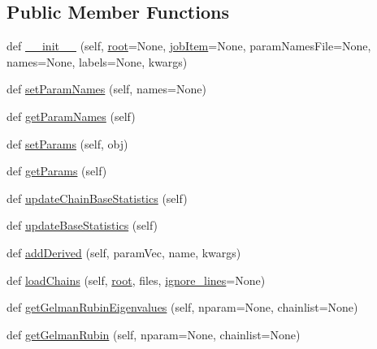 \subsection*{Public Member Functions}
\begin{DoxyCompactItemize}
\item 
def \mbox{\hyperlink{classgetdist_1_1chains_1_1Chains_af5c083e16efd5ecd1d6d41ecae4e6180}{\+\_\+\+\_\+init\+\_\+\+\_\+}} (self, \mbox{\hyperlink{classgetdist_1_1chains_1_1Chains_ae8dd7bf3c841a906ae7d6b3c83326c75}{root}}=None, \mbox{\hyperlink{classgetdist_1_1chains_1_1Chains_a0437ab45f665cbdd53ae01c4b91fd797}{job\+Item}}=None, param\+Names\+File=None, names=None, labels=None, kwargs)
\item 
def \mbox{\hyperlink{classgetdist_1_1chains_1_1Chains_a7d33c93e1eb74d6d15ae1849af5d2f8b}{set\+Param\+Names}} (self, names=None)
\item 
def \mbox{\hyperlink{classgetdist_1_1chains_1_1Chains_a2fa727ae561b8f2735806eac170a6f96}{get\+Param\+Names}} (self)
\item 
def \mbox{\hyperlink{classgetdist_1_1chains_1_1Chains_aa2e6d26b972941cdab11c8d7088fa466}{set\+Params}} (self, obj)
\item 
def \mbox{\hyperlink{classgetdist_1_1chains_1_1Chains_a3738678aec04eba1970291046eada10b}{get\+Params}} (self)
\item 
def \mbox{\hyperlink{classgetdist_1_1chains_1_1Chains_a29e10cc055140e1f5639b8ff9331b1c4}{update\+Chain\+Base\+Statistics}} (self)
\item 
def \mbox{\hyperlink{classgetdist_1_1chains_1_1Chains_a2707ea98f828744379464c54a693d906}{update\+Base\+Statistics}} (self)
\item 
def \mbox{\hyperlink{classgetdist_1_1chains_1_1Chains_a14d289c78434f27324c29aba89ea535d}{add\+Derived}} (self, param\+Vec, name, kwargs)
\item 
def \mbox{\hyperlink{classgetdist_1_1chains_1_1Chains_afd750faaaf604587c4a978a4d5aa17a1}{load\+Chains}} (self, \mbox{\hyperlink{classgetdist_1_1chains_1_1Chains_ae8dd7bf3c841a906ae7d6b3c83326c75}{root}}, files, \mbox{\hyperlink{classgetdist_1_1chains_1_1Chains_a323e8881d193a20848436d300273d421}{ignore\+\_\+lines}}=None)
\item 
def \mbox{\hyperlink{classgetdist_1_1chains_1_1Chains_a0485362be9aa8aa89b8071b59dbefae5}{get\+Gelman\+Rubin\+Eigenvalues}} (self, nparam=None, chainlist=None)
\item 
def \mbox{\hyperlink{classgetdist_1_1chains_1_1Chains_a2f1bea2051f7de3e3b5cf65cbfab872d}{get\+Gelman\+Rubin}} (self, nparam=None, chainlist=None)

\end{DoxyCompactItemize}
